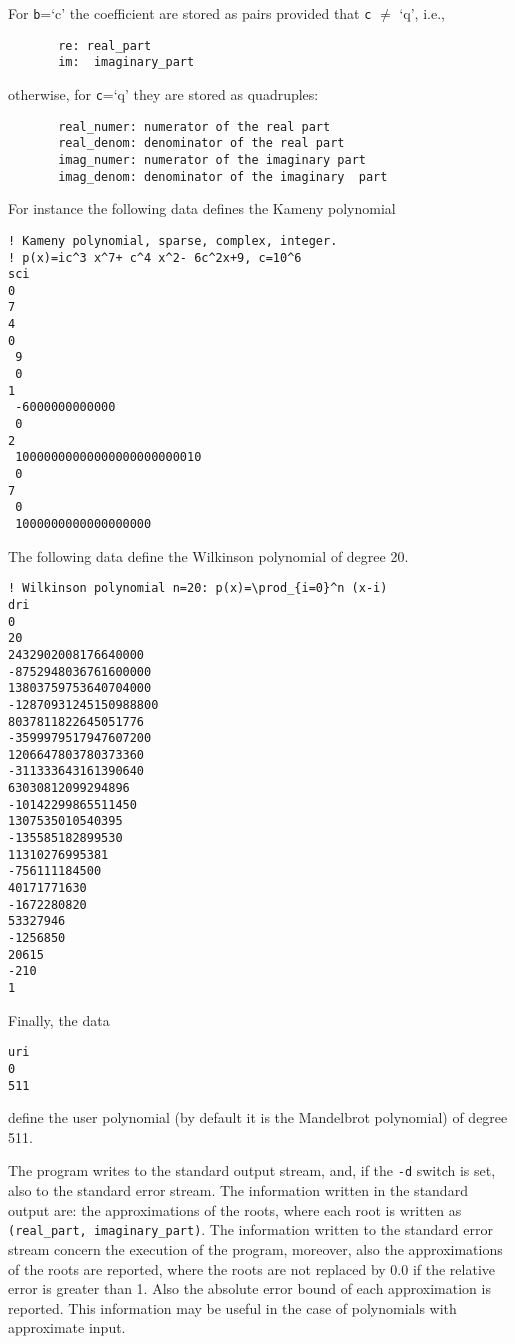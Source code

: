 \documentclass{article}
\begin{document}
\noindent
For {\tt b}=`c' the coefficient are stored as pairs provided that
{\tt c} $\neq$ `q', i.e.,
\begin{verbatim}
       re: real_part
       im:  imaginary_part
\end{verbatim}

\noindent
otherwise, for {\tt c}=`q' they are stored as quadruples:
\begin{verbatim}
       real_numer: numerator of the real part 
       real_denom: denominator of the real part 
       imag_numer: numerator of the imaginary part
       imag_denom: denominator of the imaginary  part
\end{verbatim}

\noindent
For instance the following data defines the Kameny polynomial
\begin{verbatim}
! Kameny polynomial, sparse, complex, integer.
! p(x)=ic^3 x^7+ c^4 x^2- 6c^2x+9, c=10^6
sci
0
7
4
0
 9
 0
1
 -6000000000000
 0
2
 10000000000000000000000010
 0
7
 0
 1000000000000000000
\end{verbatim}

\noindent
The following data define the Wilkinson polynomial of degree 20.
\begin{verbatim}
! Wilkinson polynomial n=20: p(x)=\prod_{i=0}^n (x-i)
dri
0
20
2432902008176640000
-8752948036761600000
13803759753640704000
-12870931245150988800
8037811822645051776
-3599979517947607200
1206647803780373360
-311333643161390640
63030812099294896
-10142299865511450
1307535010540395
-135585182899530
11310276995381
-756111184500
40171771630
-1672280820
53327946
-1256850
20615
-210
1
\end{verbatim}

\noindent
Finally, the data
\begin{verbatim}
uri
0
511
\end{verbatim}

\noindent
define the user polynomial (by default it is the Mandelbrot polynomial)
of degree 511.

The program writes to the standard output stream, and, if the {\tt -d}
switch is set, also to the standard error stream.  The information written
in the standard output are: the approximations of the roots, where
each root is written as {\tt (real\_part, imaginary\_part)}.  The
information written to the standard error stream concern the
execution of the program, moreover, also the approximations of the
roots are reported, where the roots are not replaced by 0.0 if the
relative error is greater than 1.  Also the absolute error bound of
each approximation is reported. This information may be useful in the
case of polynomials with approximate input.
\end{document}
